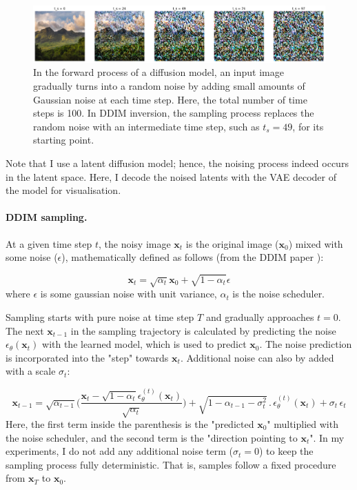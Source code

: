 \begin{figure}[ht]
  \includegraphics[width=\textwidth]{Chapters/zero-shot-tat-figs/DDIM_forward.png}
  \caption{In the forward process of a diffusion model, an input image gradually turns into a random noise by adding small amounts of Gaussian noise at each time step. Here, the total number of time steps is 100. In DDIM inversion, the sampling process replaces the random noise with an intermediate time step, such as $t_s = 49$, for its starting point.}
  \label{fig:ddim-inversion}
\end{figure}

Note that I use a latent diffusion model; hence, the noising process indeed occurs in the latent space. Here, I decode the noised latents with the VAE decoder of the model for visualisation. 

\paragraph{DDIM sampling.}
At a given time step $t$, the noisy image $\bm{x}_t$ is the original image ($\bm{x}_0$) mixed with some noise ($\epsilon$), mathematically defined as follows (from the DDIM paper \cite{song2020denoising}):

\begin{equation}
\bm{x}_t = \sqrt{\alpha_t}\bm{x}_0 + \sqrt{1 - \alpha_t}\epsilon
\end{equation}
where $\epsilon$ is some gaussian noise with unit variance, $\alpha_t$ is the noise scheduler. 

Sampling starts with pure noise at time step $T$ and gradually approaches $t = 0$. The next $\bm{x}_{t-1}$ in the sampling trajectory is calculated by predicting the noise $\epsilon_{\theta}(\bm{x}_t)$ with the learned model, which is used to predict $\bm{x}_0$. The noise prediction is incorporated into the "step" towards $\bm{x}_t$. Additional noise can also by added with a scale $\sigma_t$:

\begin{equation}
\bm{x}_{t -1} = \sqrt{\alpha_{t - 1}}\biggl(\frac{\bm{x}_t - \sqrt{1 - \alpha_t}\epsilon_{\theta}^{(t)}(\bm{x}_t)}{\sqrt{\alpha_t}}\biggl) + \sqrt{1 - \alpha_{t - 1} - \sigma_t^2} \, . \, \epsilon_{\theta}^{(t)}(\bm{x}_t) + \sigma_t \, \epsilon_t
\label{eq:ddim-sample}
\end{equation}
Here, the first term inside the parenthesis is the "predicted $\bm{x}_0$" multiplied with the noise scheduler, and the second term is the "direction pointing to $\bm{x}_t$". In my experiments, I do not add any additional noise term ($\sigma_t = 0$) to keep the sampling process fully deterministic. That is, samples follow a fixed procedure from $\bm{x}_T$ to $\bm{x}_0$.


